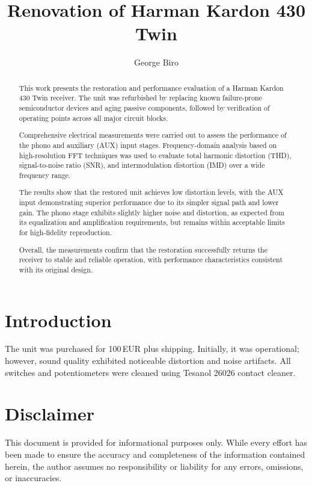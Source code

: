 \documentclass[]{article}
\title{Renovation of Harman Kardon 430 Twin}
\author{George Biro}
\begin{document}
\maketitle

\begin{abstract}
This work presents the restoration and performance evaluation of a Harman Kardon 430 Twin receiver. The unit was refurbished by replacing known failure-prone semiconductor devices and aging passive components, followed by verification of operating points across all major circuit blocks.

Comprehensive electrical measurements were carried out to assess the performance of the phono and auxiliary (AUX) input stages. Frequency-domain analysis based on high-resolution FFT techniques was used to evaluate total harmonic distortion (THD), signal-to-noise ratio (SNR), and intermodulation distortion (IMD) over a wide frequency range.

The results show that the restored unit achieves low distortion levels, with the AUX input demonstrating superior performance due to its simpler signal path and lower gain. The phono stage exhibits slightly higher noise and distortion, as expected from its equalization and amplification requirements, but remains within acceptable limits for high-fidelity reproduction.

Overall, the measurements confirm that the restoration successfully returns the receiver to stable and reliable operation, with performance characteristics consistent with its original design.

\end{abstract}

\section{Introduction}

The unit was purchased for 100\,EUR plus shipping.  
Initially, it was operational; however, sound quality exhibited noticeable distortion and noise artifacts.
All switches and potentiometers were cleaned using Tesanol 26026 contact cleaner.

\section{Disclaimer}

This document is provided for informational purposes only. While every effort has been made to ensure the accuracy and completeness of the information contained herein, the author assumes no responsibility or liability for any errors, omissions, or inaccuracies.
\end{document}
